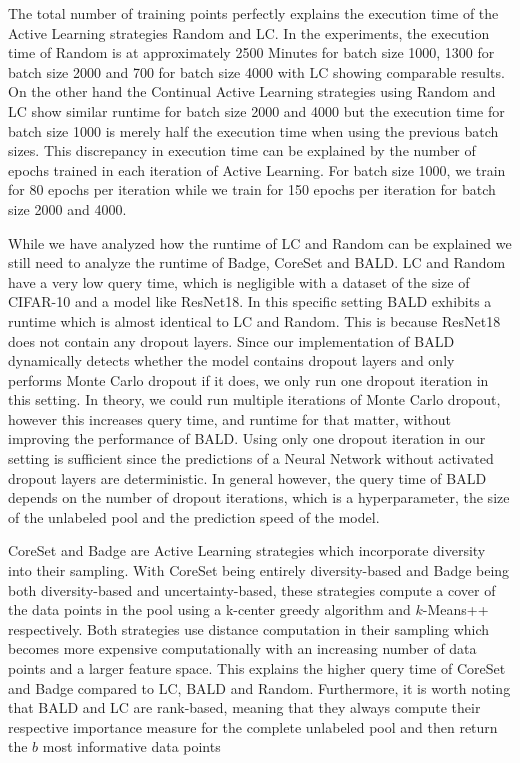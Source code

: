 The total number of training points perfectly explains the execution time of the Active Learning strategies Random and LC. In the experiments, the execution time of Random is at approximately 2500 Minutes for batch size 1000, 1300 for batch size 2000 and 700 for
batch size 4000 with LC showing comparable results. On the other hand the Continual Active Learning strategies using Random and LC show similar runtime for batch size 2000 and 4000 but the execution time for batch size 1000 is merely half the execution time when
using the previous batch sizes. This discrepancy in execution time can be explained by the number of epochs trained in each iteration of Active Learning. For batch size 1000, we train for 80 epochs per iteration while we train for 150 epochs per iteration for
batch size 2000 and 4000. \par
While we have analyzed how the runtime of LC and Random can be explained we still need to analyze the runtime of Badge, CoreSet and BALD. LC and Random have a very low query time, which is negligible with a dataset of the size of CIFAR-10 and a model like ResNet18.
In this specific setting BALD exhibits a runtime which is almost identical to LC and Random. This is because ResNet18 does not contain any dropout layers. Since our implementation of BALD dynamically detects whether the model contains dropout layers and only performs
Monte Carlo dropout if it does, we only run one dropout iteration in this setting. In theory, we could run multiple iterations of Monte Carlo dropout, however this increases query time, and runtime for that matter, without improving the performance of BALD. Using only
one dropout iteration in our setting is sufficient since the predictions of a Neural Network without activated dropout layers are deterministic. In general however, the query time of BALD depends on the number of dropout iterations, which is a hyperparameter, the size
of the unlabeled pool and the prediction speed of the model. \par
CoreSet and Badge are Active Learning strategies which incorporate diversity into their sampling. With CoreSet being entirely diversity-based and Badge being both diversity-based and uncertainty-based, these strategies compute a cover of the data points in the pool using
a k-center greedy algorithm and $k$-Means++ respectively. Both strategies use distance computation in their sampling which becomes more expensive computationally with an increasing number of data points and a larger feature space. This explains the higher query time of
CoreSet and Badge compared to LC, BALD and Random. Furthermore, it is worth noting that BALD and LC are rank-based, meaning that they always compute their respective importance measure for the complete unlabeled pool and then return the $b$ most informative data points

